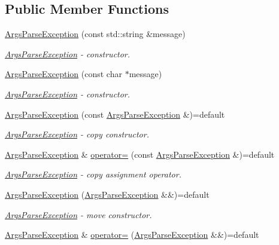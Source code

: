 \subsection*{Public Member Functions}
\begin{DoxyCompactItemize}
\item 
\hyperlink{a00001_a3d4b6c6bbd11120adce24e7f568db6ef_a3d4b6c6bbd11120adce24e7f568db6ef}{Args\+Parse\+Exception} (const std\+::string \&message)
\begin{DoxyCompactList}\small\item\em \hyperlink{a00001}{Args\+Parse\+Exception} -\/ constructor. \end{DoxyCompactList}\item 
\hyperlink{a00001_ac390957b5d1f525ebb0bad34d46e912c_ac390957b5d1f525ebb0bad34d46e912c}{Args\+Parse\+Exception} (const char $\ast$message)
\begin{DoxyCompactList}\small\item\em \hyperlink{a00001}{Args\+Parse\+Exception} -\/ constructor. \end{DoxyCompactList}\item 
\hyperlink{a00001_afe95d99b83df0d490a4804be85e93f64_afe95d99b83df0d490a4804be85e93f64}{Args\+Parse\+Exception} (const \hyperlink{a00001}{Args\+Parse\+Exception} \&)=default
\begin{DoxyCompactList}\small\item\em \hyperlink{a00001}{Args\+Parse\+Exception} -\/ copy constructor. \end{DoxyCompactList}\item 
\hyperlink{a00001}{Args\+Parse\+Exception} \& \hyperlink{a00001_acd3650bb1fa2d905628fe9221f51af91_acd3650bb1fa2d905628fe9221f51af91}{operator=} (const \hyperlink{a00001}{Args\+Parse\+Exception} \&)=default
\begin{DoxyCompactList}\small\item\em \hyperlink{a00001}{Args\+Parse\+Exception} -\/ copy assignment operator. \end{DoxyCompactList}\item 
\hyperlink{a00001_a8f4184349561f76761c2a19ab5ffe3eb_a8f4184349561f76761c2a19ab5ffe3eb}{Args\+Parse\+Exception} (\hyperlink{a00001}{Args\+Parse\+Exception} \&\&)=default
\begin{DoxyCompactList}\small\item\em \hyperlink{a00001}{Args\+Parse\+Exception} -\/ move constructor. \end{DoxyCompactList}\item 
\hyperlink{a00001}{Args\+Parse\+Exception} \& \hyperlink{a00001_a995afc8f785651694e33408b2640a608_a995afc8f785651694e33408b2640a608}{operator=} (\hyperlink{a00001}{Args\+Parse\+Exception} \&\&)=default

\end{DoxyCompactItemize}
